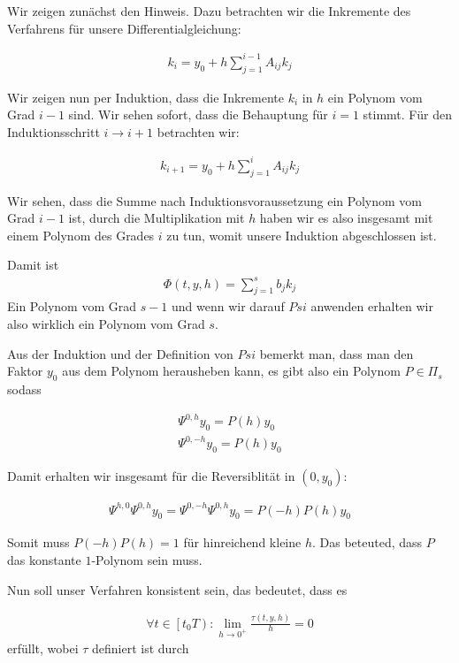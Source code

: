 \begin{solution}
  Wir zeigen zunächst den Hinweis. Dazu betrachten wir die Inkremente des Verfahrens
  für unsere Differentialgleichung:

  \begin{align*}
    k_i = y_0 + h \sum_{j=1}^{i-1}A_{ij}k_j
  \end{align*}

  Wir zeigen nun per Induktion, dass die Inkremente $k_i$ in $h$ ein Polynom vom Grad
  $i-1$ sind. Wir sehen sofort, dass die Behauptung für $i=1$ stimmt. Für den
  Induktionsschritt $i \rightarrow i+1$ betrachten wir:

  \begin{align*}
    k_{i+1} = y_0 + h \sum_{j=1}^iA_{ij}k_j
  \end{align*}

  Wir sehen, dass die Summe nach Induktionsvoraussetzung ein Polynom vom Grad
  $i-1$ ist, durch die Multiplikation mit $h$ haben wir es also insgesamt mit einem
  Polynom des Grades $i$ zu tun, womit unsere Induktion abgeschlossen ist.

  Damit ist
  \begin{align*}
    \Phi(t,y,h) = \sum_{j=1}^s b_j k_j
  \end{align*}
  Ein Polynom vom Grad $s-1$ und wenn wir darauf $Psi$ anwenden erhalten wir also
  wirklich ein Polynom vom Grad $s$.

  Aus der Induktion und der Definition von $Psi$ bemerkt man, dass man den Faktor
  $y_0$ aus dem Polynom herausheben kann, es gibt also ein Polynom $P \in \Pi_s$
  sodass

  \begin{align*}
    \Psi^{0,h} y_0 = P(h)y_0 \\
    \Psi^{0,-h} y_0 = P(h)y_0
  \end{align*}

  Damit erhalten wir insgesamt für die Reversiblität in $(0,y_0)$:

  \begin{align*}
    \Psi^{h,0}\Psi^{0,h}y_0 = \Psi^{0,-h}\Psi^{0,h}y_0
    = P(-h)P(h)y_0
  \end{align*}

  Somit muss $P(-h)P(h) = 1$ für hinreichend kleine $h$. Das beteuted, dass $P$
  das konstante $1$-Polynom sein muss.

  Nun soll unser Verfahren konsistent sein, das bedeutet, dass es

  \begin{align*}
    \forall t \in \left[t_0 T\right): \lim_{h\rightarrow 0^+}
    \frac{\tau(t,y,h)}{h} = 0
  \end{align*}
  erfüllt, wobei $\tau$ definiert ist durch


\end{solution}
